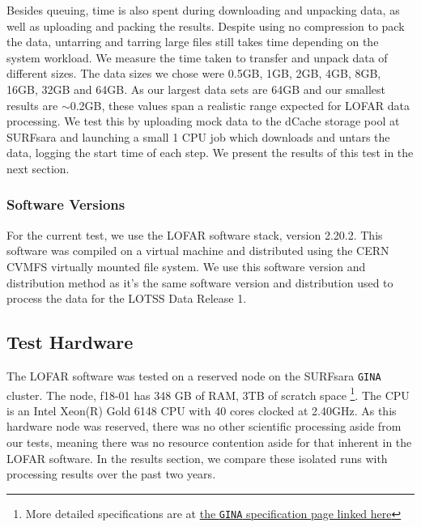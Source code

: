 Besides queuing, time is also spent during downloading and unpacking data, as well as uploading and packing the results. Despite using no compression to pack the data, untarring and tarring large files still takes time depending on the system workload. We measure the time taken to transfer and unpack data of different sizes. The data sizes we chose were 0.5GB, 1GB, 2GB, 4GB, 8GB, 16GB, 32GB and 64GB. As our largest data sets are 64GB and our smallest results are $\sim$0.2GB, these values span a realistic range expected for LOFAR data processing. We test this by uploading mock data to the dCache storage pool at SURFsara and launching a small 1 CPU job which downloads and untars the data, logging the start time of each step. We present the results of this test in the next section. 


\subsubsection{Software Versions}\label{sec:software_versions}
For the current test, we use the LOFAR software stack, version 2.20.2\citep{cookbook}. This software was compiled on a virtual machine and distributed using the CERN CVMFS virtually mounted file system. We use this software version and distribution method as it's the same software version and distribution used to process the data for the LOTSS Data Release 1. 

\subsection{Test Hardware}\label{sec:hardware}

The LOFAR software was tested on a reserved node on the SURFsara \texttt{GINA} cluster. The node, f18-01 has 348 GB of RAM, 3TB of scratch space \footnote{More detailed specifications are at \href{http://docs.surfsaralabs.nl/projects/grid/en/latest/Pages/Service/system_specifications/gina_specs.html}{the \texttt{GINA} specification page linked here}}. The CPU is an Intel Xeon(R) Gold 6148 CPU with 40 cores clocked at 2.40GHz.  As this hardware node was reserved, there was no other scientific processing aside from our tests, meaning there was no resource contention aside for that inherent in the LOFAR software. In the results section, we compare these isolated runs with processing results over the past two years. 
